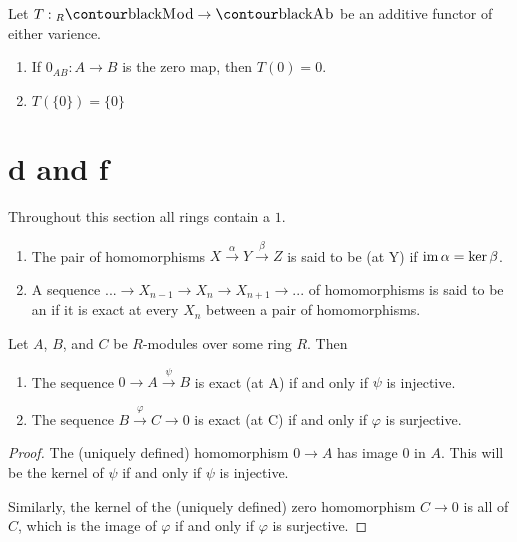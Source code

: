         \begin{proposition}
            Let $T:{}_{R}\cMod \rightarrow \cAb$ be an additive functor of either varience.
                \begin{enumerate}[label = (\arabic*)]
                    \item If $0_{AB}:A \rightarrow B$ is the zero map, then $T(0) = 0$.
                    \item $T(\{0\}) = \{0\}$
                \end{enumerate}
        \end{proposition}

\section{d and f}
Throughout this section all rings contain a $1$.
    \begin{definition}
        \phantom{a}
        \begin{enumerate}[label = (\arabic*)]
            \item The pair of homomorphisms $X \xrightarrow{\alpha} Y \xrightarrow{\beta} Z$ is said to be  (at Y) if $\operatorname{im}{\alpha} = \ker{\beta}$.
            \item A sequence $... \rightarrow X_{n-1} \rightarrow X_n \rightarrow X_{n+1} \rightarrow ...$ of homomorphisms is said to be an  if it is exact at every $X_n$ between a pair of homomorphisms.
        \end{enumerate}
    \end{definition}

    \begin{proposition}
        Let $A$, $B$, and $C$ be $R$-modules over some ring $R$. Then
            \begin{enumerate}[label = (\arabic*)]
                \item The sequence $0 \rightarrow A \xrightarrow{\psi} B$ is exact (at A) if and only if $\psi$ is injective.
                \item The sequence $B \xrightarrow{\varphi} C \rightarrow 0$ is exact (at C) if and only if $\varphi$ is surjective.
            \end{enumerate}
    \end{proposition}
        \begin{proof}
            The (uniquely defined) homomorphism $0 \rightarrow A$ has image $0$ in $A$. This will be the kernel of $\psi$ if and only if $\psi$ is injective.

            Similarly, the kernel of the (uniquely defined) zero homomorphism $C \rightarrow 0$ is all of $C$, which is the image of $\varphi$ if and only if $\varphi$ is surjective.
        \end{proof}